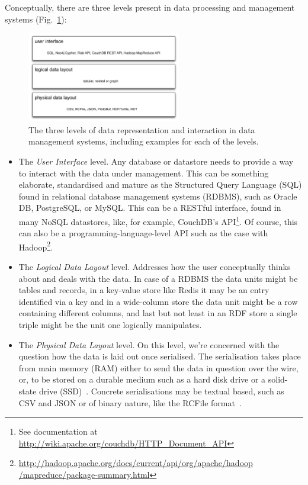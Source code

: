 \documentclass{llncs}
\begin{document}
Conceptually, there are three levels present in data processing and management 
systems (Fig.~\ref{fig:data-layers}):
\begin{figure}[ht!]
\centering
\includegraphics[width=0.6\textwidth]{data-layers}
\caption{The three levels of data representation and interaction in data 
management systems, including examples for each of the levels.}
\label{fig:data-layers}
\end{figure}
\begin{itemize}
\item The \emph{User Interface} level. Any database or datastore needs 
to provide a way to interact with the data under management. This can be 
something elaborate, standardised and mature as the Structured Query Language 
(SQL) found in relational database management systems (RDBMS), such as 
Oracle DB, PostgreSQL, or MySQL. This can be a RESTful interface, found in many 
NoSQL datastores, like, for example, CouchDB's API\footnote{See documentation at
\url{http://wiki.apache.org/couchdb/HTTP_Document_API}}. Of course, this can 
also be a programming-language-level API such as the case with
Hadoop\footnote{\url{http://hadoop.apache.org/docs/current/api/org/apache/hadoop
/mapreduce/package-summary.html}}.
\item The \emph{Logical Data Layout} level. Addresses how the user conceptually
thinks about and deals with the data. In case of a RDBMS the data units might be
tables and records, in a key-value store like Redis it may be an entry 
identified via a key and in a wide-column store the data unit might be a row
containing different columns, and last but not least in an RDF store a single
triple might be the unit one logically manipulates.
\item The \emph{Physical Data Layout} level. On this level, we're concerned with
the question how the data is laid out once serialised. The serialisation takes
place from main memory (RAM) either to send the data in question over the wire,
or, to be stored on a durable medium such as a hard disk drive or a solid-state 
drive (SSD)~\cite{Cornwell:ACMQ1}. Concrete serialisations may
be textual based, such as CSV and JSON or of binary nature, like the RCFile 
format~\cite{He:ICDE11}. 
\end{itemize}
\end{document}
